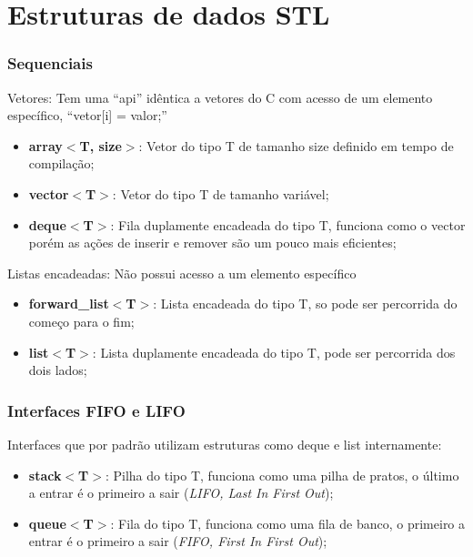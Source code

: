 \documentclass[12pt]{beamer}
\begin{document}
\section{Estruturas de dados STL}
\begin{frame}[allowframebreaks]
    \frametitle{Sequenciais}

    Vetores:
    Tem uma ``api'' idêntica a vetores do C com acesso de um elemento específico, ``vetor[i] = valor;''

    \begin{itemize}
        \item\textbf{array$<$T, size$>$}: Vetor do tipo T de tamanho size definido em tempo de compilação;
        \item\textbf{vector$<$T$>$}: Vetor do tipo T de tamanho variável;
        \item \textbf{deque$<$T$>$}: Fila duplamente encadeada do tipo T, funciona como o vector porém as ações de inserir e remover são um pouco mais eficientes;
    \end{itemize}

    \framebreak

    Listas encadeadas: Não possui acesso a um elemento específico
    \begin{itemize}
        \item\textbf{forward\_list$<$T$>$}: Lista encadeada do tipo T, so pode ser percorrida do começo para o fim;
        \item\textbf{list$<$T$>$}: Lista duplamente encadeada do tipo T, pode ser percorrida dos dois lados;
    \end{itemize}
\end{frame}

\begin{frame}
    \frametitle{Interfaces FIFO e LIFO}

    Interfaces que por padrão utilizam estruturas como deque e list internamente:

    \begin{itemize}
        \item\textbf{stack$<$T$>$}: Pilha do tipo T, funciona como uma pilha de pratos, o último a entrar é o primeiro a sair (\textit{LIFO, Last In First Out});
        \item\textbf{queue$<$T$>$}: Fila do tipo T, funciona como uma fila de banco, o primeiro a entrar é o primeiro a sair (\textit{FIFO, First In First Out});
    \end{itemize}

\end{frame}
\end{document}

